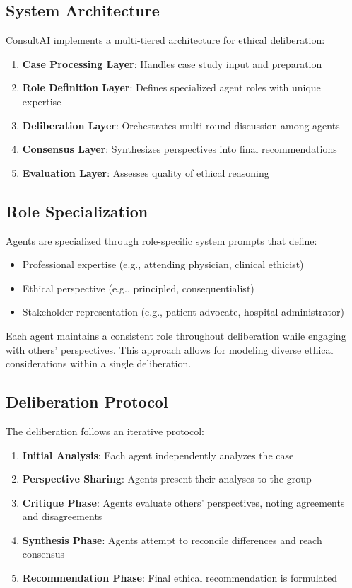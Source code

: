 \documentclass[11pt]{article}
\begin{document}
\subsection{System Architecture}

ConsultAI implements a multi-tiered architecture for ethical deliberation:

\begin{enumerate}
    \item \textbf{Case Processing Layer}: Handles case study input and preparation
    \item \textbf{Role Definition Layer}: Defines specialized agent roles with unique expertise
    \item \textbf{Deliberation Layer}: Orchestrates multi-round discussion among agents
    \item \textbf{Consensus Layer}: Synthesizes perspectives into final recommendations
    \item \textbf{Evaluation Layer}: Assesses quality of ethical reasoning
\end{enumerate}


\subsection{Role Specialization}

Agents are specialized through role-specific system prompts that define:
\begin{itemize}
    \item Professional expertise (e.g., attending physician, clinical ethicist)
    \item Ethical perspective (e.g., principled, consequentialist)
    \item Stakeholder representation (e.g., patient advocate, hospital administrator)
\end{itemize}

Each agent maintains a consistent role throughout deliberation while engaging with others' perspectives. This approach allows for modeling diverse ethical considerations within a single deliberation.

\subsection{Deliberation Protocol}

The deliberation follows an iterative protocol:
\begin{enumerate}
    \item \textbf{Initial Analysis}: Each agent independently analyzes the case
    \item \textbf{Perspective Sharing}: Agents present their analyses to the group
    \item \textbf{Critique Phase}: Agents evaluate others' perspectives, noting agreements and disagreements
    \item \textbf{Synthesis Phase}: Agents attempt to reconcile differences and reach consensus
    \item \textbf{Recommendation Phase}: Final ethical recommendation is formulated
\end{enumerate}
\end{document}

